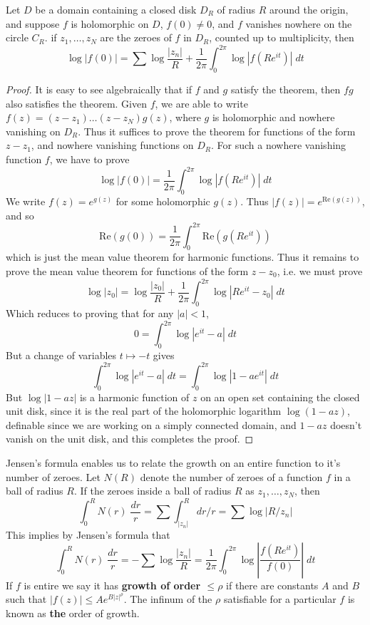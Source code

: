 \begin{theorem}
    Let $D$ be a domain containing a closed disk $D_R$ of radius $R$ around the origin, and suppose $f$ is holomorphic on $D$, $f(0) \neq 0$, and $f$ vanishes nowhere on the circle $C_R$. if $z_1, \dots, z_N$ are the zeroes of $f$ in $D_R$, counted up to multiplicity, then
    \[ \log |f(0)| = \sum \log \frac{|z_n|}{R} + \frac{1}{2\pi} \int_0^{2\pi} \log |f(Re^{it})|\; dt \]
\end{theorem}
\begin{proof}
    It is easy to see algebraically that if $f$ and $g$ satisfy the theorem, then $fg$ also satisfies the theorem. Given $f$, we are able to write $f(z) = (z - z_1) \dots (z - z_N) g(z)$, where $g$ is holomorphic and nowhere vanishing on $D_R$. Thus it suffices to prove the theorem for functions of the form $z - z_1$, and nowhere vanishing functions on $D_R$. For such a nowhere vanishing function $f$, we have to prove
    \[ \log |f(0)| = \frac{1}{2\pi} \int_0^{2\pi} \log |f(Re^{it})|\; dt \]
    We write $f(z) = e^{g(z)}$ for some holomorphic $g(z)$. Thus $|f(z)| = e^{\text{Re}(g(z))}$, and so
    \[ \text{Re}(g(0)) = \frac{1}{2\pi} \int_0^{2\pi} \text{Re}(g(Re^{it})) \]
    which is just the mean value theorem for harmonic functions. Thus it remains to prove the mean value theorem for functions of the form $z - z_0$, i.e. we must prove
    \[ \log |z_0| = \log \frac{|z_0|}{R} + \frac{1}{2\pi} \int_0^{2\pi} \log |Re^{it} - z_0|\; dt \]
    Which reduces to proving that for any $|a| < 1$,
    \[ 0 = \int_0^{2\pi} \log |e^{it} - a|\; dt \]
    But a change of variables $t \mapsto -t$ gives
    \[ \int_0^{2\pi} \log |e^{it} - a|\; dt = \int_0^{2\pi} \log |1 - ae^{it}|\; dt \]
    But $\log |1 - az|$ is a harmonic function of $z$ on an open set containing the closed unit disk, since it is the real part of the holomorphic logarithm $\log(1 - az)$, definable since we are working on a simply connected domain, and $1 - az$ doesn't vanish on the unit disk, and this completes the proof.
\end{proof}

Jensen's formula enables us to relate the growth on an entire function to it's number of zeroes. Let $N(R)$ denote the number of zeroes of a function $f$ in a ball of radius $R$. If the zeroes inside a ball of radius $R$ as $z_1, \dots, z_N$, then
%
\[ \int_0^R N(r)\; \frac{dr}{r} = \sum \int_{|z_n|}^R dr/r = \sum \log |R/z_n| \]
%
This implies by Jensen's formula that
%
\[ \int_0^R N(r)\; \frac{dr}{r} = - \sum \log \frac{|z_n|}{R} = \frac{1}{2\pi} \int_0^{2\pi} \log \left| \frac{f(Re^{it})}{f(0)} \right|\; dt \]
%
If $f$ is entire we say it has {\bf growth of order $\leq \rho$} if there are constants $A$ and $B$ such that $|f(z)| \leq Ae^{B |z|^\rho}$. The infinum of the $\rho$ satisfiable for a particular $f$ is known as {\bf the} order of growth.


